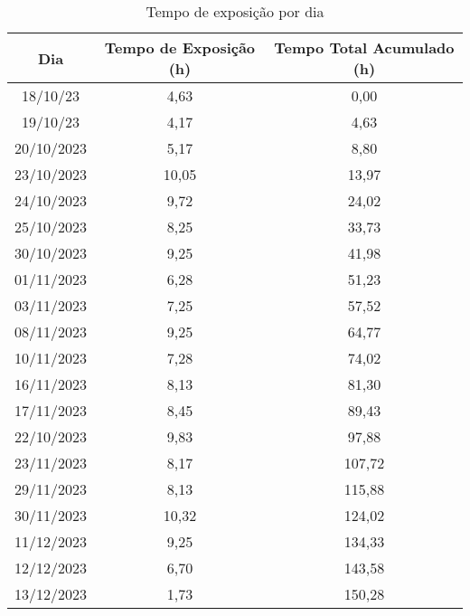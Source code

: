\begin{table}[H]
\centering
\caption{Tempo de exposição por dia}
\begin{tabular}{|c|c|c|}
\hline
\textbf{Dia} & \textbf{Tempo de Exposição (h)} & \textbf{Tempo Total Acumulado (h)} \\ \hline
18/10/23 & 4,63 & 0,00 \\ \hline
19/10/23 & 4,17 & 4,63 \\ \hline
20/10/2023 & 5,17 & 8,80 \\ \hline
23/10/2023 & 10,05 & 13,97 \\ \hline
24/10/2023 & 9,72 & 24,02 \\ \hline
25/10/2023 & 8,25 & 33,73 \\ \hline
30/10/2023 & 9,25 & 41,98 \\ \hline
01/11/2023 & 6,28 & 51,23 \\ \hline
03/11/2023 & 7,25 & 57,52 \\ \hline
08/11/2023 & 9,25 & 64,77 \\ \hline
10/11/2023 & 7,28 & 74,02 \\ \hline
16/11/2023 & 8,13 & 81,30 \\ \hline
17/11/2023 & 8,45 & 89,43 \\ \hline
22/10/2023 & 9,83 & 97,88 \\ \hline
23/11/2023 & 8,17 & 107,72 \\ \hline
29/11/2023 & 8,13 & 115,88 \\ \hline
30/11/2023 & 10,32 & 124,02 \\ \hline
11/12/2023 & 9,25 & 134,33 \\ \hline
12/12/2023 & 6,70 & 143,58 \\ \hline
13/12/2023 & 1,73 & 150,28 \\ \hline
\end{tabular}
\label{tab:TempoDia}
\end{table}